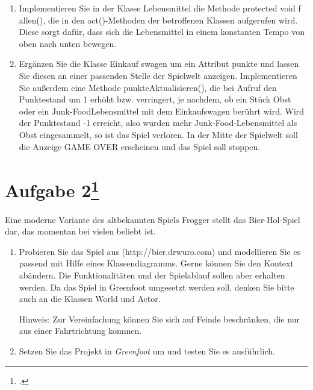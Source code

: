 \documentclass{lehramt-informatik-haupt}
\begin{document}
\begin{enumerate}
\item Implementieren Sie in der Klasse Lebensmittel die Methode
protected void f allen(), die in den act()-Methoden der betroffenen
Klassen aufgerufen wird. Diese sorgt dafür, dass sich die Lebensmittel
in einem konstanten Tempo von oben nach unten bewegen.


\item Ergänzen Sie die Klasse Einkauf swagen um ein Attribut punkte und
lassen Sie diesen an einer passenden Stelle der Spielwelt anzeigen.
Implementieren Sie außerdem eine Methode punkteAktualisieren(), die bei
Aufruf den Punktestand um 1 erhöht bzw. verringert, je nachdem, ob ein
Stück Obst oder ein Junk-FoodLebensmittel mit dem Einkaufswagen berührt
wird. Wird der Punktestand -1 erreicht, also wurden mehr
Junk-Food-Lebensmittel als Obst eingesammelt, so ist das Spiel verloren.
In der Mitte der Spielwelt soll die Anzeige GAME OVER erscheinen und
das Spiel soll stoppen.

\end{enumerate}

%

\section{Aufgabe 2\footcite{oomup:ab:3}}

Eine moderne Variante des altbekannten Spiels Frogger stellt das
Bier-Hol-Spiel dar, das momentan bei vielen beliebt ist.

\begin{enumerate}

%

\item Probieren Sie das Spiel aus (http://bier.drwuro.com) und
modellieren Sie es passend mit Hilfe eines Klassendiagramms. Gerne
können Sie den Kontext abändern. Die Funktionalitäten und der
Spielablauf sollen aber erhalten werden. Da das Spiel in Greenfoot
umgesetzt werden soll, denken Sie bitte auch an die Klassen World und
Actor.

Hinweis: Zur Vereinfachung können Sie sich auf Feinde beschränken, die
nur aus einer Fahrtrichtung kommen.

%

\item Setzen Sie das Projekt in \emph{Greenfoot} um und testen Sie es
ausführlich.

\begin{liAntwort}
\end{liAntwort}
\end{enumerate}
\end{document}
